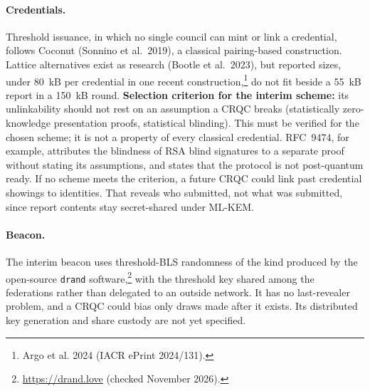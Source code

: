 \documentclass[10pt,twoside,openany]{book}
\theoremstyle{dpepstyle}
\begin{document}
\paragraph{Credentials.}
Threshold issuance, in which no single council can mint or link a credential, follows Coconut (Sonnino et al.\ 2019), a classical pairing-based construction. Lattice alternatives exist as research (Bootle et al.\ 2023), but reported sizes, under 80~kB per credential in one recent construction,\footnote{Argo et al. 2024 (IACR ePrint 2024/131).} do not fit beside a 55~kB report in a 150~kB round. \textbf{Selection criterion for the interim scheme:} its unlinkability should not rest on an assumption a CRQC breaks (statistically zero-knowledge presentation proofs, statistical blinding). This must be verified for the chosen scheme; it is not a property of every classical credential. RFC~9474, for example, attributes the blindness of RSA blind signatures to a separate proof without stating its assumptions, and states that the protocol is not post-quantum ready. If no scheme meets the criterion, a future CRQC could link past credential showings to identities. That reveals who submitted, not what was submitted, since report contents stay secret-shared under ML-KEM.

\paragraph{Beacon.}
The interim beacon uses threshold-BLS randomness of the kind produced by the open-source \texttt{drand} software,\footnote{\url{https://drand.love} (checked November 2026).} with the threshold key shared among the federations rather than delegated to an outside network. It has no last-revealer problem, and a CRQC could bias only draws made after it exists. Its distributed key generation and share custody are not yet specified.
\end{document}
